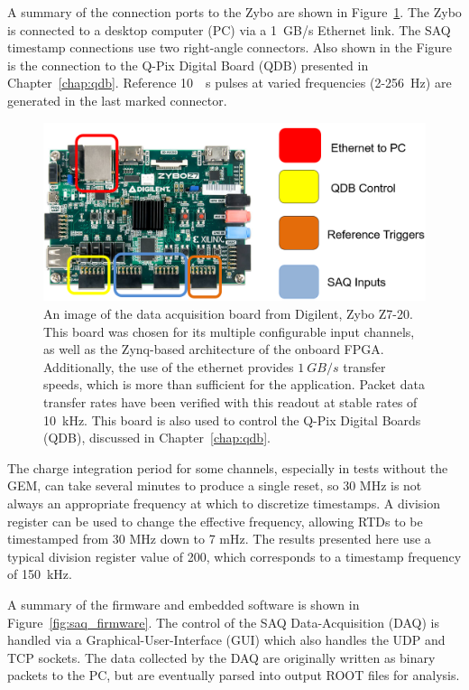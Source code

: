 A summary of the connection ports to the Zybo are shown in Figure~\ref{fig:saq_zybo}.
The Zybo is connected to a desktop computer (PC) via a 1~\unit{GB/s} Ethernet link.
The SAQ timestamp connections use two right-angle connectors.
Also shown in the Figure is the connection to the Q-Pix Digital Board (QDB) presented in Chapter~\ref{chap:qdb}.
Reference 10~\unit{\mu s} pulses at varied frequencies (2-256~\unit{Hz}) are generated in the last marked connector.

\begin{figure}[]
\centering
\includegraphics[width=\textwidth]{images/saq_zybo_io_summary.png}
\caption{An image of the data acquisition board from Digilent, Zybo Z7-20. 
This board was chosen for its multiple configurable input channels, as well as the Zynq-based architecture of the onboard FPGA.
Additionally, the use of the ethernet provides $1~\unit{GB/s}$ transfer speeds, which is more than sufficient for the application.
Packet data transfer rates have been verified with this readout at stable rates of 10~\unit{kHz}.
This board is also used to control the Q-Pix Digital Boards (QDB), discussed in Chapter~\ref{chap:qdb}.
}
\label{fig:saq_zybo}
\end{figure}

The charge integration period for some channels, especially in tests without the GEM, can take several minutes to produce a single reset, so 30 MHz is not always an appropriate frequency at which to discretize timestamps.
A division register can be used to change the effective frequency, allowing RTDs to be timestamped from 30 MHz down to 7 mHz.
The results presented here use a typical division register value of 200, which corresponds to a timestamp frequency of 150~\unit{kHz}.

A summary of the firmware and embedded software is shown in Figure~\ref{fig:saq_firmware}.
The control of the SAQ Data-Acquisition (DAQ) is handled via a Graphical-User-Interface (GUI) which also handles the UDP and TCP sockets.
The data collected by the DAQ are originally written as binary packets to the PC, but are eventually parsed into output ROOT files for analysis.

